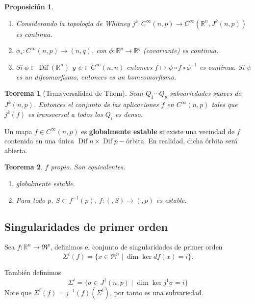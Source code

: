 \documentclass[12pt]{book}
\newtheorem{teo}{Teorema}
\newtheorem{pro}{Proposición}
\newcommand{\dif}{\operatorname{Dif}}
\begin{document}
\begin{pro}
	\begin{enumerate}
		\item Considerando la topologia de Whitney $j^k : C^\infty(n,p) \rightarrow C^\infty (\mathbb{R}^n,  J^k (n,p)) $ es continua.
		\item $\phi_*: C^\infty (n,p) \rightarrow (n,q)$, con $\phi : \mathbb{R}^p \rightarrow \mathbb{R}^q$ (covariante) es continua.
		\item Si $\phi \in \operatorname{Dif} (\mathbb{R}^n)$ y $\psi \in C^\infty (n,n)$ entonces $f \mapsto \psi \circ f \circ \phi^{-1}$ es continua. Si $\psi$ es un difeomorfismo, entonces es un homeomorfismo.
	\end{enumerate}
\end{pro}




\begin{teo}[Transversalidad de Thom]
	Sean $Q_1 \cdots Q_p$ subvariedades suaves de $J^k(n,p)$. Entonces el conjunto de las aplicaciones $f$ en $C^\infty(n,p)$ tales que $j^k (f)$ es transversal a todos los $Q_i$ es denso.
\end{teo}



Un mapa $f \in C^\infty (n,p)$ es \textbf{globalmente estable} si existe una vecindad de $f$ contenida en una única $\dif n \times \dif p-$órbita. En realidad, dicha órbita será abierta.

\begin{teo}
$f$ propio. Son equivalentes.
\begin{enumerate}
\item globalmente estable.
\item Para todo $p $, $S \subset f^{-1}(p)$, $f: ( , S) \rightarrow (, p)$ es estable.
\end{enumerate}
\end{teo}



\subsection{Singularidades de primer orden}

Sea $f: \mathbb{R}^n\rightarrow \Re ^p $, definimos el conjunto de singularidades de primer orden $$ \Sigma ^i (f) =\{ x \in \Re ^n \; |\; \dim \ker df (x) =i\}. $$

También definimos $$ \Sigma ^i = \{  \sigma \in J^1 (n,p) \; | \; \dim \ker j^1 \sigma = i \} $$
Note que $\Sigma ^i (f) = j^{-1} (f) (\Sigma ^ i ) $, por tanto es una subvariedad.\\
\end{document}
